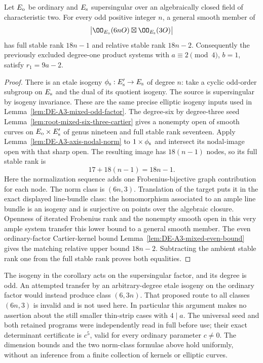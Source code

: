 \begin{corollary}
\label{cor:DE-A3-mixed-thin-vone}
Let $E_{\rm o}$ be ordinary and $E_{\rm s}$ supersingular over
an algebraically closed field of characteristic two.
For every odd positive integer $n$, a general smooth member of
\[
          \bigl|\OO_{E_{\rm o}}(6nO)
                     \boxtimes\OO_{E_{\rm s}}(3O)\bigr|
\]
has full stable rank $18n-1$ and relative stable rank $18n-2$.
Consequently the previously excluded degree-one product
systems with $a\equiv2\pmod4$, $b=1$, satisfy
$r_1=9a-2$.
\end{corollary}
\begin{proof}
There is an etale isogeny
$\phi_{\rm s}:E'_{\rm s}\to E_{\rm s}$ of degree $n$:
take a cyclic odd-order subgroup on $E_{\rm s}$ and the dual
of its quotient isogeny.  The source is supersingular by
isogeny invariance.  These are the same precise elliptic
isogeny inputs used in
Lemma~\ref{lem:DE-A3-mixed-odd-factor}.
The degree-six by degree-three seed
Lemma~\ref{lem:root-mixed-six-three-cartier}
gives a nonempty open of smooth curves on
$E_{\rm o}\times E'_{\rm s}$ of genus nineteen and full stable
rank seventeen.
Apply Lemma~\ref{lem:DE-A3-axis-nodal-norm} to
$1\times\phi_{\rm s}$ and intersect its nodal-image open
with that sharp open.
The resulting image has $18(n-1)$ nodes, so its full stable
rank is
\[
                         17+18(n-1)=18n-1.
\]
Here the normalization sequence adds one Frobenius-bijective
graph contribution for each node.
The norm class is $(6n,3)$.
Translation of the target puts it in the exact displayed
line-bundle class: the homomorphism associated to an ample
line bundle is an isogeny and is surjective on points over
the algebraic closure.
Openness of iterated Frobenius rank and the nonempty smooth
open in this very ample system transfer this lower bound
to a general smooth member.
The even ordinary-factor Cartier-kernel bound
Lemma~\ref{lem:DE-A3-mixed-even-bound}
gives the matching relative upper bound $18n-2$.
Subtracting the ambient stable rank one from the full stable
rank proves both equalities.
\end{proof}

\begin{remark}
\label{rem:DE-A3-mixed-axis-scope}
The isogeny in the corollary acts on the supersingular factor,
and its degree is odd.
An attempted transfer by an arbitrary-degree etale isogeny on
the ordinary factor would instead produce class $(6,3n)$.
That proposed route to all classes $(6n,3)$ is invalid and is
not used here.  In particular this argument makes no assertion
about the still smaller thin-strip cases with $4\mid a$.
The universal seed and both retained programs were independently
read in full before use; their exact determinant certificate is
$c^5$, valid for every ordinary parameter $c\ne0$.
The dimension bounds and the two norm-class formulae above
hold uniformly, without an inference from a finite collection
of kernels or elliptic curves.
\end{remark}
